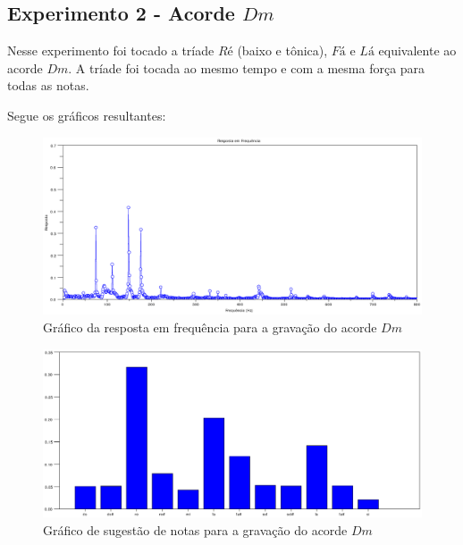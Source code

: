 \subsection{Experimento 2 - Acorde $Dm$}
\label{sec:experimento2}

Nesse experimento foi tocado a tríade $Ré$ (baixo e tônica), $Fá$ e $Lá$ equivalente ao acorde $Dm$. A tríade foi tocada ao mesmo tempo e com a mesma força para todas as notas.

Segue os gráficos resultantes:

\begin{figure}[h]
	\centering
		\includegraphics[keepaspectratio=true,scale=0.49]{figuras/Dm/fft_Dm.eps}
	\caption{Gráfico da resposta em frequência para a gravação do acorde $Dm$}
  \label{fig:espectro_Dm}
\end{figure}

\begin{figure}[h]
	\centering
		\includegraphics[keepaspectratio=true,scale=0.49]{figuras/Dm/notas_Dm.eps}
	\caption{Gráfico de sugestão de notas para a gravação do acorde $Dm$}
  \label{fig:notas_Dm}
\end{figure}

